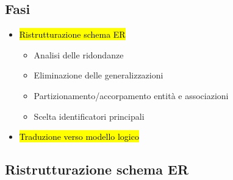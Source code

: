 \documentclass[a4paper]{article}
\begin{document}
\subsection*{Fasi}
\begin{itemize}[noitemsep, leftmargin=*]
  \item \hl{Ristrutturazione schema ER}
        \begin{itemize}[noitemsep]
          \item Analisi delle ridondanze
          \item Eliminazione delle generalizzazioni
          \item Partizionamento/accorpamento entità e associazioni
          \item Scelta identificatori principali
        \end{itemize}
  \item \hl{Traduzione verso modello logico}
\end{itemize}\par \subsection{Ristrutturazione schema ER}
\end{document}
